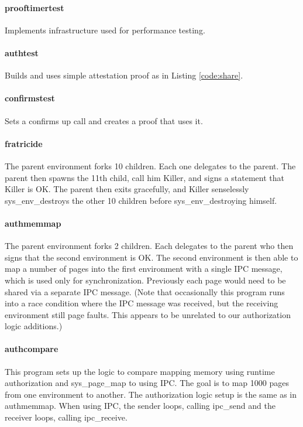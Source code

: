 \documentclass[10pt]{article}
\begin{document}
\paragraph{prooftimertest} Implements infrastructure used for performance testing.
\paragraph{authtest} Builds and uses simple attestation proof as in Listing \ref{code:share}.
\paragraph{confirmstest} Sets a confirms up call and creates a proof that uses it.
\paragraph{fratricide} The parent environment forks 10 children.  Each one delegates to the parent.  The parent then spawns the 11th child, call him Killer, and signs a statement that Killer is OK.  The parent then exits gracefully, and Killer senselessly \textsf{sys\_env\_destroy}s the other 10 children before \textsf{sys\_env\_destroy}ing himself.
\paragraph{authmemmap} The parent environment forks 2 children.  Each delegates to the parent who then signs that the second environment is OK.  The second environment is then able to map a number of pages into the first environment with a single IPC message, which is used only for synchronization.  Previously each page would need to be shared via a separate IPC message.  (Note that occasionally this program runs into a race condition where the IPC message was received, but the receiving environment still page faults.  This appears to be unrelated to our authorization logic additions.)
\paragraph{authcompare} This program sets up the logic to compare mapping memory using runtime authorization and \textsf{sys\_page\_map} to using IPC.  The goal is to map 1000 pages from one environment to another.  The authorization logic setup is the same as in \textsf{authmemmap}.  When using IPC, the sender loops, calling \textsf{ipc\_send} and the receiver loops, calling \textsf{ipc\_receive}.
\end{document}
